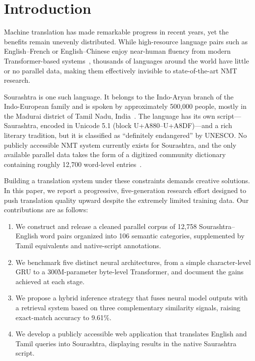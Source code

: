 \documentclass[conference]{IEEEtran}
\begin{document}
\section{Introduction}

Machine translation has made remarkable progress in recent years, yet the benefits remain unevenly distributed. While high-resource language pairs such as English--French or English--Chinese enjoy near-human fluency from modern Transformer-based systems~\cite{vaswani2017attention}, thousands of languages around the world have little or no parallel data, making them effectively invisible to state-of-the-art NMT research.

Sourashtra is one such language. It belongs to the Indo-Aryan branch of the Indo-European family and is spoken by approximately 500,000 people, mostly in the Madurai district of Tamil Nadu, India~\cite{ethnologue2023}. The language has its own script---Saurashtra, encoded in Unicode 5.1 (block U+A880--U+A8DF)---and a rich literary tradition, but it is classified as ``definitely endangered'' by UNESCO. No publicly accessible NMT system currently exists for Sourashtra, and the only available parallel data takes the form of a digitized community dictionary containing roughly 12,700 word-level entries~\cite{sourashtra_dict}.

Building a translation system under these constraints demands creative solutions. In this paper, we report a progressive, five-generation research effort designed to push translation quality upward despite the extremely limited training data. Our contributions are as follows:

\begin{enumerate}
    \item We construct and release a cleaned parallel corpus of 12,758 Sourashtra--English word pairs organized into 106 semantic categories, supplemented by Tamil equivalents and native-script annotations.
    \item We benchmark five distinct neural architectures, from a simple character-level GRU to a 300M-parameter byte-level Transformer, and document the gains achieved at each stage.
    \item We propose a hybrid inference strategy that fuses neural model outputs with a retrieval system based on three complementary similarity signals, raising exact-match accuracy to 9.61\%.
    \item We develop a publicly accessible web application that translates English and Tamil queries into Sourashtra, displaying results in the native Saurashtra script.
\end{enumerate}
\end{document}

